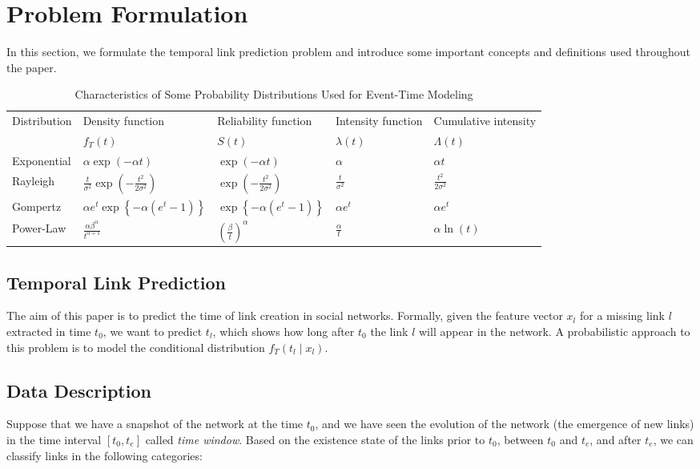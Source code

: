 \section{Problem Formulation}\label{sec:problem}
In this section, we formulate the temporal link prediction problem and introduce some important concepts and definitions used throughout the paper.

\begin{table*}
\centering
\caption{Characteristics of Some Probability Distributions Used for Event-Time Modeling}
\label{table:dists}
\begin{tabu} to \textwidth {X X[c] X[c] X[c] X[c]}
\toprule
Distribution & Density function & Reliability function & Intensity function & Cumulative intensity\\
& $f_T(t)$ & $S(t)$ & $\lambda(t)$ & $\Lambda(t)$\\[1pt]
\midrule %
Exponential & $\alpha\exp(-\alpha t)$ & $\exp(-\alpha t)$ & $\alpha$ & $\alpha t$\\[4pt]
Rayleigh & $\frac{t}{\sigma^2}\exp(-\frac{t^2}{2\sigma^2})$ & $\exp(-\frac{t^2}{2\sigma^2})$ & $\frac{t}{\sigma^2}$ & $\frac{t^2}{2\sigma^2}$\\[4pt]
Gompertz & $\alpha e^t\exp\left\lbrace -\alpha(e^t-1) \right\rbrace$ & $\exp\left\lbrace -\alpha(e^t-1) \right\rbrace$ & $\alpha e^t$ & $\alpha e^t$\\[2pt]
Power-Law & $\frac{\alpha\beta^\alpha}{t^{\alpha+1}}$ & $\left(\frac{\beta}{t}\right)^\alpha$ & $\frac{\alpha}{t}$ & $\alpha\ln(t)$\\
\bottomrule %
\end{tabu}
\end{table*}

\subsection{Temporal Link Prediction}
The aim of this paper is to predict the time of link creation in social networks.
Formally, given the feature vector $x_l$ for a missing link $l$ extracted in time $t_0$, we want to predict $t_l$, which shows how long after $t_0$ the link $l$ will appear in the network. A probabilistic approach to this problem is to model the conditional distribution $f_T(t_l\mid x_l)$.

\subsection{Data Description}
Suppose that we have a snapshot of the network at the time $t_0$, and we have seen the evolution of the network (the emergence of new links) in the time interval $[t_0,t_e]$ called \textit{time window}. Based on the existence state of the links prior to $t_0$, between $t_0$ and $t_e$, and after $t_e$, we can classify links in the following categories:


